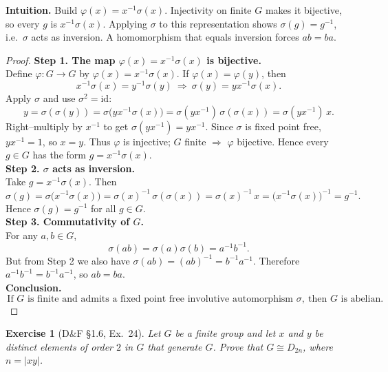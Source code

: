 \documentclass[12pt]{article}
\newtheorem{exercise}[theorem]{Exercise}
\theoremstyle{definition}
\begin{document}
\noindent\textbf{Intuition.}
Build $\varphi(x)=x^{-1}\sigma(x)$. Injectivity on finite $G$ makes it bijective, so every $g$ is $x^{-1}\sigma(x)$.
Applying $\sigma$ to this representation shows $\sigma(g)=g^{-1}$, i.e.\ $\sigma$ acts as inversion. A homomorphism
that equals inversion forces $ab=ba$.\\

\dotfill

\begin{proof}
\noindent\textbf{Step 1. The map $\varphi(x)=x^{-1}\sigma(x)$ is bijective.}\\
\noindent Define $\varphi:G\to G$ by $\varphi(x)=x^{-1}\sigma(x)$. If $\varphi(x)=\varphi(y)$, then
\[
x^{-1}\sigma(x)=y^{-1}\sigma(y)\ \Longrightarrow\ \sigma(y)=yx^{-1}\sigma(x).
\]
Apply $\sigma$ and use $\sigma^2=\mathrm{id}$:
\[
y=\sigma(\sigma(y))=\sigma\big(yx^{-1}\sigma(x)\big)=\sigma(yx^{-1})\,\sigma(\sigma(x))=\sigma(yx^{-1})\,x.
\]
Right–multiply by $x^{-1}$ to get $\sigma(yx^{-1})=yx^{-1}$. Since $\sigma$ is fixed point free, $yx^{-1}=1$, so $x=y$.
Thus $\varphi$ is injective; $G$ finite $\Rightarrow$ $\varphi$ bijective. Hence every $g\in G$ has the form $g=x^{-1}\sigma(x)$.\\

\noindent\textbf{Step 2. $\sigma$ acts as inversion.}\\
\noindent Take $g=x^{-1}\sigma(x)$. Then
\[
\sigma(g)=\sigma\!\big(x^{-1}\sigma(x)\big)=\sigma(x)^{-1}\,\sigma(\sigma(x))=\sigma(x)^{-1}\,x
=\big(x^{-1}\sigma(x)\big)^{-1}=g^{-1}.
\]
Hence $\sigma(g)=g^{-1}$ for all $g\in G$.\\

\noindent\textbf{Step 3. Commutativity of $G$.}\\
\noindent For any $a,b\in G$,
\[
\sigma(ab)=\sigma(a)\sigma(b)=a^{-1}b^{-1}.
\]
But from Step 2 we also have $\sigma(ab)=(ab)^{-1}=b^{-1}a^{-1}$. Therefore $a^{-1}b^{-1}=b^{-1}a^{-1}$, so $ab=ba$.\\

\noindent\textbf{Conclusion.}
\[
\boxed{\,\text{If $G$ is finite and admits a fixed point free involutive automorphism }\sigma,\ \text{then }G\text{ is abelian}.}
\]
\end{proof}

\newpage

\begin{exercise}[D\&F §1.6, Ex.~24]
Let $G$ be a finite group and let $x$ and $y$ be distinct elements of order $2$ in $G$ that generate $G$. 
Prove that $G \cong D_{2n}$, where $n = |xy|$. 
\end{exercise}
\end{document}
